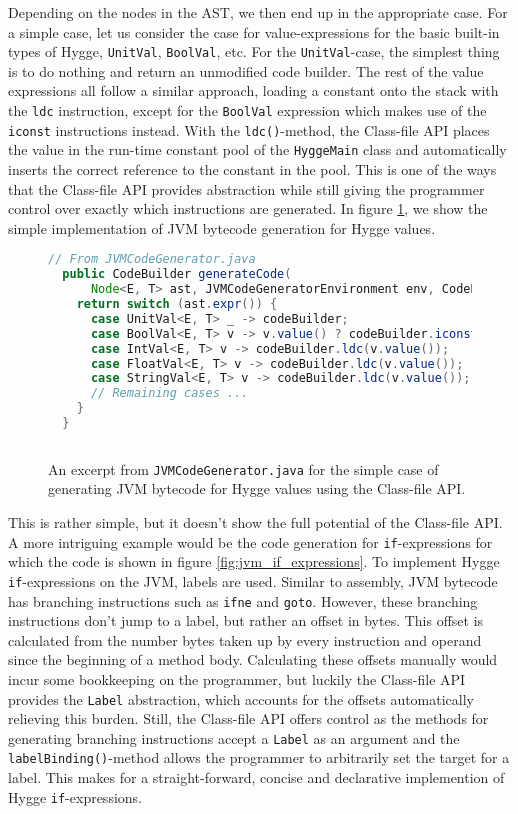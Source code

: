 Depending on the nodes in the AST, we then end up in the appropriate case. For a simple case, let us consider the case
for value-expressions for the basic built-in types of Hygge, \texttt{UnitVal}, \texttt{BoolVal}, etc. For the \texttt{UnitVal}-case,
the simplest thing is to do nothing and return an unmodified code builder. The rest of the value expressions all follow a similar approach,
loading a constant onto the stack with the \texttt{ldc} instruction, except for the \texttt{BoolVal} expression which makes use of the
\texttt{iconst} instructions instead. With the \texttt{ldc()}-method, the Class-file API places the value in the run-time constant pool
of the \texttt{HyggeMain} class and automatically inserts the correct reference to the constant in the pool. This is one of the ways
that the Class-file API provides abstraction while still giving the programmer control over exactly which instructions are generated.
In figure \ref{fig:jvm_value_codegen}, we show the simple implementation of JVM bytecode generation for Hygge values.

\begin{figure}[H]
\centering
\begin{lstlisting}[language=Java]
  // From JVMCodeGenerator.java
  public CodeBuilder generateCode(
      Node<E, T> ast, JVMCodeGeneratorEnvironment env, CodeBuilder codeBuilder) {
    return switch (ast.expr()) {
      case UnitVal<E, T> _ -> codeBuilder;
      case BoolVal<E, T> v -> v.value() ? codeBuilder.iconst_1() : codeBuilder.iconst_0();
      case IntVal<E, T> v -> codeBuilder.ldc(v.value());
      case FloatVal<E, T> v -> codeBuilder.ldc(v.value());
      case StringVal<E, T> v -> codeBuilder.ldc(v.value());
      // Remaining cases ... 
    }
  }
 
\end{lstlisting}
\caption{An excerpt from \texttt{JVMCodeGenerator.java} for the simple case of generating JVM bytecode for Hygge values using the Class-file API.}
\label{fig:jvm_value_codegen}
\end{figure}

This is rather simple, but it doesn't show the full potential of the Class-file API. A more intriguing example would be the code generation
for \texttt{if}-expressions for which the code is shown in figure \ref{fig:jvm_if_expressions}. To implement Hygge \texttt{if}-expressions on the JVM, labels are used. Similar to assembly, JVM bytecode
has branching instructions such as \texttt{ifne} and \texttt{goto}. However, these branching instructions don't jump to a label, but rather an offset in bytes.
This offset is calculated from the number bytes taken up by every instruction and operand since the beginning of a method body. Calculating
these offsets manually would incur some bookkeeping on the programmer, but luckily the Class-file API provides the \texttt{Label} abstraction,
which accounts for the offsets automatically relieving this burden. Still, the Class-file API offers control as the methods for generating branching
instructions accept a \texttt{Label} as an argument and the \texttt{labelBinding()}-method allows the programmer to arbitrarily set the target for a label.
This makes for a straight-forward, concise and declarative implemention of Hygge \texttt{if}-expressions.

